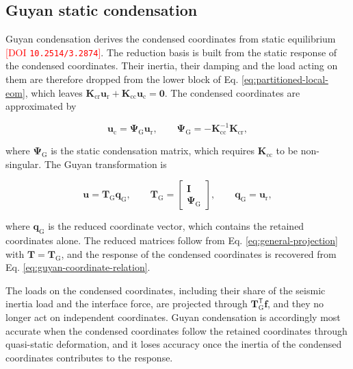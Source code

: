 \documentclass[a4paper,fleqn,review,12pt]{cas-sc}
\numberwithin{equation}{section}
\newcommand{\rev}[1]{\textcolor{red}{#1}}
\begin{document}
\subsection{Guyan static condensation} \label{sec21}

Guyan condensation derives the condensed coordinates from static equilibrium \cite{Guyan1965}\,\rev{[DOI \nolinkurl{10.2514/3.2874}]}. The reduction basis is built from the static response of the condensed coordinates. Their inertia, their damping and the load acting on them are therefore dropped from the lower block of Eq. \eqref{eq:partitioned-local-eom}, which leaves \(\mathbf{K}_{\mathrm{cr}}\bm{u}_{\mathrm{r}}+\mathbf{K}_{\mathrm{cc}}\bm{u}_{\mathrm{c}}=\bm{0}\). The condensed coordinates are approximated by

\vspace{-3.5em}
\begin{equation}
	\bm{u}_{\mathrm{c}}=\bm{\Psi}_{\mathrm{G}}\bm{u}_{\mathrm{r}},
	\qquad
	\bm{\Psi}_{\mathrm{G}}=-\mathbf{K}_{\mathrm{cc}}^{-1}\mathbf{K}_{\mathrm{cr}},
	\label{eq:guyan-coordinate-relation}
\end{equation}
\vspace{-3.5em}

\noindent where \(\bm{\Psi}_{\mathrm{G}}\) is the static condensation matrix, which requires \(\mathbf{K}_{\mathrm{cc}}\) to be non-singular.
The Guyan transformation is

\vspace{-3.5em}
\begin{equation}
	\bm{u}=\mathbf{T}_{\mathrm{G}}\bm{q}_{\mathrm{G}},
	\qquad
	\mathbf{T}_{\mathrm{G}}=
	\begin{bmatrix}
		\mathbf{I}\\
		\bm{\Psi}_{\mathrm{G}}
	\end{bmatrix},
	\qquad
	\bm{q}_{\mathrm{G}}=\bm{u}_{\mathrm{r}},
	\label{eq:guyan-transformation}
\end{equation}
\vspace{-3.5em}

\noindent where \(\bm{q}_{\mathrm{G}}\) is the reduced coordinate vector, which contains the retained coordinates alone. The reduced matrices follow from Eq. \eqref{eq:general-projection} with \(\mathbf{T}=\mathbf{T}_{\mathrm{G}}\), and the response of the condensed coordinates is recovered from Eq. \eqref{eq:guyan-coordinate-relation}.

The loads on the condensed coordinates, including their share of the seismic inertia load and the interface force, are projected through \(\mathbf{T}_{\mathrm{G}}^{\mathsf{T}}\bm{f}\), and they no longer act on independent coordinates. Guyan condensation is accordingly most accurate when the condensed coordinates follow the retained coordinates through quasi-static deformation, and it loses accuracy once the inertia of the condensed coordinates contributes to the response.
\end{document}
